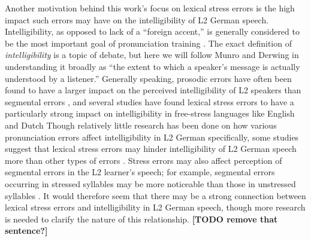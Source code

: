 \documentclass[a4paper]{article}
\newcommand{\TODO}[1]{{\color{red}\textbf{[TODO #1]}}}
\begin{document}
	
	
	Another motivation behind this work's focus on lexical stress errors is the high impact such errors may have on the intelligibility of L2 German speech.
	Intelligibility, as opposed to lack of a “foreign accent,” is generally considered to be the most important goal of pronunciation training \cite{Munro1999,Neri2002,Derwing2005,Field2005,Witt2012}. The exact definition of \textit{intelligibility} is a topic of debate,
	but here we will follow Munro and Derwing \cite[p.~289]{Munro1999} in understanding it broadly as ``the extent to which a speaker’s message is actually understood by a listener.''
	Generally speaking, prosodic errors have often been found to have a larger impact on the perceived intelligibility of L2 speakers than segmental errors 
	\cite{Derwing2005,Witt2012}, and several studies have found lexical stress errors to have a particularly strong impact on intelligibility in free-stress languages like English and Dutch \cite{Cutler2005,Field2005} 
	Though relatively little research has been done on how various pronunciation errors affect intelligibility in L2 German specifically, some studies suggest that 
	lexical stress errors 
	may hinder intelligibility of L2 German speech more than other types of errors \cite{Hirschfeld1994,Hirschfeld2007}.
	Stress errors may also affect perception of segmental errors in the L2 learner’s speech; for example, segmental errors occurring in stressed syllables may be more noticeable than those in unstressed syllables \cite{Cutler2005,Michaux2012}. 
	It would therefore seem that there may be a strong connection between lexical stress errors and intelligibility in L2 German speech, though more research is needed to clarify the nature of this relationship. \TODO{remove that sentence?}
	
\end{document}
